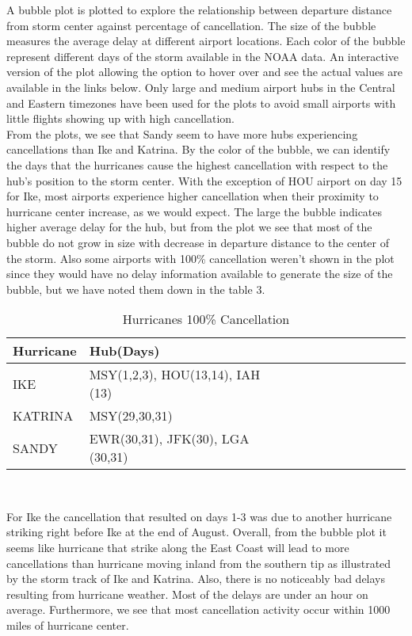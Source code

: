 A bubble plot is plotted to explore the relationship between departure distance from storm center against percentage of cancellation. The size of the bubble measures the average delay at different airport locations. Each color of the bubble represent different days of the storm available in the NOAA data. An interactive version of the plot allowing the option to hover over and see the actual values are available in the links below. Only large and medium airport hubs in the Central and Eastern timezones have been used for the plots to avoid small airports with little flights showing up with high cancellation. \\

From the plots, we see that Sandy seem to have more hubs experiencing cancellations than Ike and Katrina. By the color of the bubble, we can identify the days that the hurricanes cause the highest cancellation with respect to the hub's position to the storm center. With the exception of HOU airport on day 15 for Ike, most airports experience higher cancellation when their proximity to hurricane center increase, as we would expect. The large the bubble indicates higher average delay for the hub, but from the plot we see that most of the bubble do not grow in size with decrease in departure distance to the center of the storm. Also some airports with 100\% cancellation weren't shown in the plot since they would have no delay information available to generate the size of the bubble, but we have noted them down in the table 3. 

\begin{table}[H]
\centering
\caption{Hurricanes 100\% Cancellation}
\label{Hurricanes 100 Cancellation}
\begin{tabular}{@{}l|lllllllllll@{}}
\toprule
Hurricane & Hub(Days) \\ \midrule
IKE & MSY(1,2,3), HOU(13,14), IAH (13) \\
KATRINA & MSY(29,30,31) \\
SANDY & EWR(30,31), JFK(30), LGA (30,31)\\
\bottomrule
\end{tabular}\\
\end{table}

For Ike the cancellation that resulted on days 1-3 was due to another hurricane striking right before Ike at the end of August. Overall, from the bubble plot it seems like hurricane that strike along the East Coast will lead to more cancellations than hurricane moving inland from the southern tip as illustrated by the storm track of Ike and Katrina. Also, there is no noticeably bad delays resulting from hurricane weather. Most of the delays are under an hour on average. Furthermore, we see that most cancellation activity occur within 1000 miles of hurricane center. 

